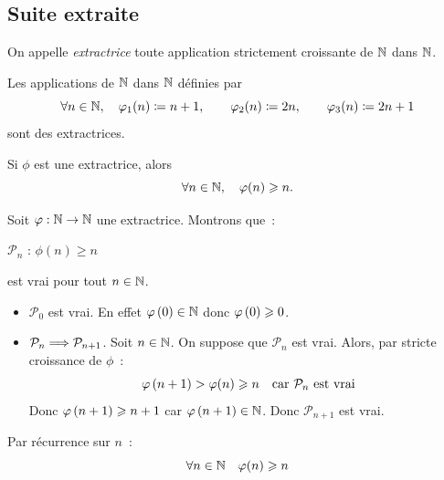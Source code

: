 \documentclass{magnolia}
\begin{document}
\subsection{Suite extraite}

\begin{definition}[utile=-3]
On appelle \emph{extractrice} toute application strictement croissante de $\mathbb{N}$ dans
$\mathbb{N}$.  
\end{definition}

\begin{remarqueUnique}
\remarque Les applications de $\mathbb{N}$ dans $\mathbb{N}$ définies par
  \[\forall n\in\mathbb{N} ,\quad \varphi_1(n)\coloneqq n+1, \qquad \varphi_2(n)\coloneqq 2n, \qquad
    \varphi_3(n)\coloneqq 2n+1\]
  sont des extractrices.
\end{remarqueUnique}


\begin{proposition}[utile=-3]
Si $\phi$ est une extractrice, alors
\[\forall n\in\mathbb{N} ,\quad \varphi(n)\geqslant n.\]
\end{proposition}

\begin{preuve}
Soit $\varphi:\mathbb{N}\to\mathbb{N}$ une extractrice. Montrons que~:
\begin{center}
$\mathcal{P}_n$ : \og $\phi(n)\geq n$ \fg
\end{center}
est vrai pour tout $n\in\mathbb{N}$.
\begin{itemize}
\item $\mathcal{P}_0$ est vrai. En effet $\varphi\left(0\right)\in\mathbb{N}$ donc
  $\varphi\left(0\right)\geqslant 0$.
\item $\mathcal{P}_n\Longrightarrow\mathcal{P}_{n+1}$. Soit $n\in\mathbb{N}$. On suppose que
  $\mathcal{P}_n$ est vrai. Alors, par stricte croissance de $\phi$~:
  \[\varphi\left(n+1\right)>\varphi(n)\geqslant n \quad \text{car $\mathcal{P}_n$ est vrai}\]
  Donc $\varphi\left(n+1\right)\geqslant n+1$ car $\varphi\left(n+1\right)\in\mathbb{N}$. Donc
  $\mathcal{P}_{n+1}$ est vrai.
\end{itemize}
Par récurrence sur $n$~:
\[\forall n\in\mathbb{N} \quad \varphi(n)\geqslant n\]
\end{preuve}
\end{document}
